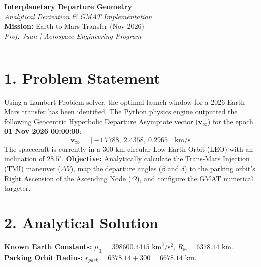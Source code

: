\documentclass[11pt, letterpaper]{article}
\begin{document}
\begin{center}
    {\Large \textbf{Interplanetary Departure Geometry}} \\
    \vspace{0.2cm}
    {\large \textit{Analytical Derivation \& GMAT Implementation}} \\
    \vspace{0.4cm}
    \textbf{Mission:} Earth to Mars Transfer (Nov 2026) \\
    \textit{Prof. Juan | Aerospace Engineering Program}
\end{center}

\hrule
\vspace{0.5cm}

\section*{1. Problem Statement}
Using a Lambert Problem solver, the optimal launch window for a 2026 Earth-Mars transfer has been identified. The Python physics engine outputted the following Geocentric Hyperbolic Departure Asymptote vector ($\boldsymbol{v}_\infty$) for the epoch \textbf{01 Nov 2026 00:00:00}:
\begin{equation}
    \boldsymbol{v}_\infty = [-1.7788,\ 2.4358,\ 0.2965] \text{ km/s}
\end{equation}
The spacecraft is currently in a 300 km circular Low Earth Orbit (LEO) with an inclination of $28.5^\circ$. \textbf{Objective:} Analytically calculate the Trans-Mars Injection (TMI) maneuver ($\Delta V$), map the departure angles ($\beta$ and $\delta$) to the parking orbit's Right Ascension of the Ascending Node ($\Omega$), and configure the GMAT numerical targeter.

\section*{2. Analytical Solution}

\textbf{Known Earth Constants:} $\mu_\oplus = 398600.4415 \text{ km}^3/\text{s}^2$, $R_\oplus = 6378.14 \text{ km}$. \\
\textbf{Parking Orbit Radius:} $r_{park} = 6378.14 + 300 = 6678.14 \text{ km}$.
\end{document}
